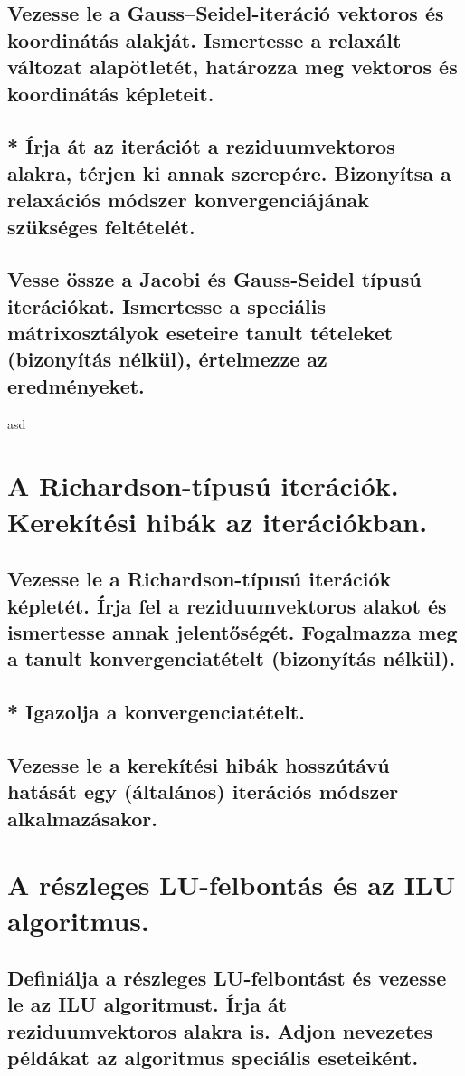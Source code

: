 \documentclass{article}
\begin{document}
        \subsection{Vezesse le a Gauss–Seidel-iteráció vektoros és koordinátás alakját. Ismertesse a relaxált változat alapötletét, határozza meg vektoros és koordinátás képleteit.}
        \subsection{* Írja át az iterációt a reziduumvektoros alakra, térjen ki annak szerepére. Bizonyítsa a relaxációs módszer konvergenciájának szükséges feltételét.}
        \subsection{Vesse össze a Jacobi és Gauss-Seidel típusú iterációkat. Ismertesse a speciális mátrixosztályok eseteire tanult tételeket (bizonyítás nélkül), értelmezze az eredményeket.}

asd
    \section{A Richardson-típusú iterációk. Kerekítési hibák az iterációkban.}
        \subsection{Vezesse le a Richardson-típusú iterációk képletét. Írja fel a reziduumvektoros alakot és ismertesse annak jelentőségét. Fogalmazza meg a tanult konvergenciatételt (bizonyítás nélkül).}
        \subsection{* Igazolja a konvergenciatételt.}
        \subsection{Vezesse le a kerekítési hibák hosszútávú hatását egy (általános) iterációs módszer alkalmazásakor.}


    \section{A részleges LU-felbontás és az ILU algoritmus.}
        \subsection{Definiálja a részleges LU-felbontást és vezesse le az ILU algoritmust. Írja át reziduumvektoros alakra is. Adjon nevezetes példákat az algoritmus speciális eseteiként.}
\end{document}
